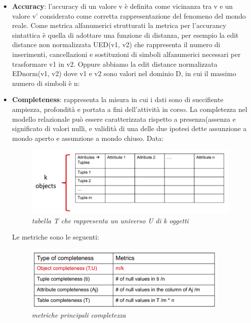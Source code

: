 \documentclass[a4paper,12pt]{article}
\begin{document}
\begin{itemize}
\item \textbf{Accuracy}: l'accuracy di un valore v è definita come vicinanza tra v e un valore v' considerato come corretta rappresentazione del fenomeno del mondo reale. Come metrica alfanumerici strutturati la metrica per l'accurancy sintattica è quella di adottare una funzione di distanza, per esempio la edit distance non normalizzata UED(v1, v2) che rappresenta il numero di inserimenti, cancellazioni e sostituzioni di simboli alfanumerici necessari per trasformare v1 in v2. Oppure abbiamo la edit distance normalizzata EDnorm(v1, v2) dove v1 e v2 sono valori nel dominio D, in cui il massimo numero di simboli è n:

\begin{center}
\end{center}

\item \textbf{Completeness}: rappresenta la misura in cui i dati sono di succifiente ampiezza, profondità e portata a fini dell'attività in corso. La completezza nel modello relazionale può essere caratterizzata rispetto a presenza(assenza e significato di valori nulli, e validità di una delle due ipotesi dette assunzione a mondo aperto e assunzione a mondo chiuso. Data:
\begin{figure}[H]
	\centering
	\includegraphics[width=0.8\linewidth]{img/table.png}
	\caption{\textit{tabella T che rappresenta un universo U di k oggetti }}
\end{figure}

Le metriche sono le seguenti:
\begin{figure}[H]
	\centering
	\includegraphics[width=0.8\linewidth]{img/metricheCompletezza.png}
	\caption{\textit{metriche principali completezza}}
\end{figure}


\end{itemize}
\end{document}
